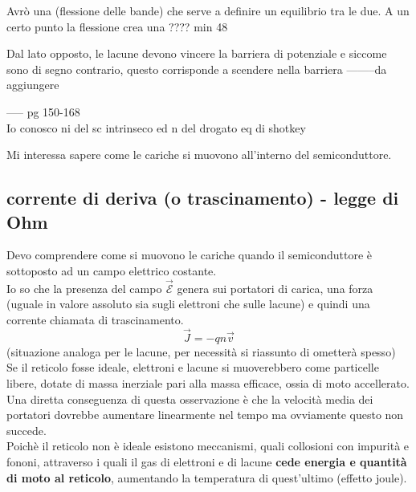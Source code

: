 Avrò una (flessione delle bande) che serve a definire un equilibrio tra le due.
A un certo punto la flessione crea una ???? min 48

Dal lato opposto, le lacune devono vincere la barriera di potenziale e siccome sono di segno contrario, questo corrisponde a scendere nella barriera
--------da aggiungere

-----
pg 150-168\\
Io conosco ni  del sc intrinseco ed n del drogato eq di shotkey

Mi interessa sapere come le cariche si muovono all'interno del semiconduttore.
\begin{center}
\end{center}

\subsection{corrente di deriva (o trascinamento) - legge di Ohm}
Devo comprendere come si muovono le cariche quando il semiconduttore è sottoposto ad un campo elettrico costante.\\
Io so che la presenza del campo $\mathcal{\vec{E}}$ genera sui portatori di carica, una forza (uguale in valore assoluto sia sugli elettroni che sulle lacune) e quindi una corrente chiamata di trascinamento.\\
%
\begin{equation}
 \vec{J}=-qn\vec{v}
\end{equation}
%
(situazione analoga per le lacune, per necessità si riassunto di ometterà spesso)\\
%
Se il reticolo fosse ideale, elettroni e lacune si muoverebbero come particelle libere, dotate di massa inerziale pari alla massa efficace, ossia di moto accellerato. Una diretta conseguenza di questa osservazione è che la velocità media dei portatori dovrebbe aumentare linearmente nel tempo ma ovviamente questo non succede.\\
Poichè il reticolo non è ideale esistono meccanismi, quali collosioni con impurità e fononi, attraverso i quali il gas di elettroni e di lacune \textbf{cede energia e quantità di moto al reticolo}, aumentando la temperatura di quest'ultimo (effetto joule).\\


